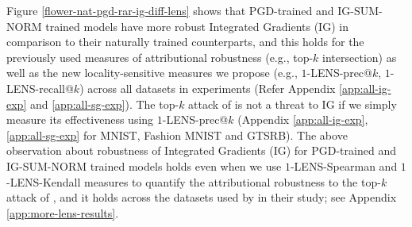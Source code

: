 \documentclass[letterpaper]{article} %
\begin{document}

Figure \ref{flower-nat-pgd-rar-ig-diff-lens} shows that PGD-trained and IG-SUM-NORM trained models have more robust Integrated Gradients (IG) in comparison to their naturally trained counterparts, and this holds for the previously used measures of attributional robustness (e.g., top-$k$ intersection) as well as the new locality-sensitive measures we propose (e.g., $1$-LENS-prec@$k$, $1$-LENS-recall@$k$) across all datasets in \citet{chen2019robust} experiments (Refer Appendix \ref{app:all-ig-exp} and \ref{app:all-sg-exp}). The top-$k$ attack of \citet{ghorbani2018interpretation} is not a threat to IG if we simply measure its effectiveness using $1$-LENS-prec@$k$ (Appendix \ref{app:all-ig-exp}, \ref{app:all-sg-exp} for MNIST, Fashion MNIST and GTSRB). The above observation about robustness of Integrated Gradients (IG) for PGD-trained and IG-SUM-NORM trained models holds even when we use $1$-LENS-Spearman and $1$-LENS-Kendall measures to quantify the attributional robustness to the top-$k$ attack of \citet{ghorbani2018interpretation}, and it holds across the datasets used by \citet{chen2019robust} in their study; see Appendix \ref{app:more-lens-results}.

\end{document}
